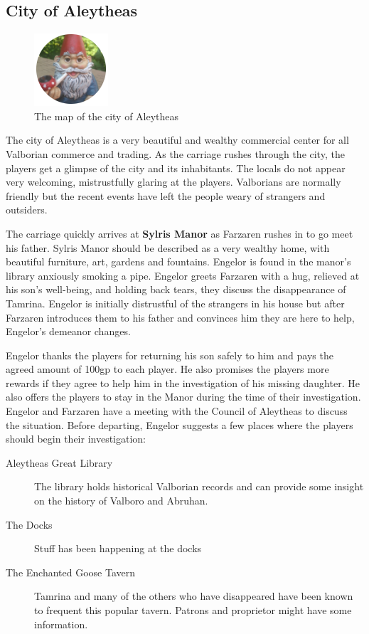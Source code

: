 \begin{multicols*}{2}
\subsection*{City of Aleytheas}

\begin{figure}
	\centering
	\includegraphics[]{images/placeholder}
	\caption{The map of the city of Aleytheas}
\end{figure}

The city of Aleytheas is a very beautiful and wealthy commercial center for all Valborian commerce and trading. As the carriage rushes through the city, the players get a glimpse of the city and its inhabitants. The locals do not appear very welcoming, mistrustfully glaring at the players. Valborians are normally friendly but the recent events have left the people weary of strangers and outsiders.

The carriage quickly arrives at \textbf{Sylris Manor} as Farzaren rushes in to go meet his father. Sylris Manor should be described as a very wealthy home, with beautiful furniture, art, gardens and fountains. Engelor is found in the manor’s library anxiously smoking a pipe. Engelor greets Farzaren with a hug, relieved at his son’s well-being, and holding back tears, they discuss the disappearance of Tamrina. Engelor is initially distrustful of the strangers in his house but after Farzaren introduces them to his father and convinces him they are here to help, Engelor's demeanor changes.

Engelor thanks the players for returning his son safely to him and pays the agreed amount of 100gp to each player. He also promises the players more rewards if they agree to help him in the investigation of his missing daughter. He also offers the players to stay in the Manor during the time of their investigation. Engelor and Farzaren have a meeting with the Council of Aleytheas to discuss the situation. Before departing, Engelor suggests a few places where the players should begin their investigation:

\begin{description}
	\item[Aleytheas Great Library] The library holds historical Valborian records and can provide some insight on the history of Valboro and Abruhan. 
	\item[The Docks] Stuff has been happening at the docks
	\item[The Enchanted Goose Tavern] Tamrina and many of the others who have disappeared have been known to frequent this popular tavern. Patrons and proprietor might have some information.
\end{description} 


\end{multicols*}
